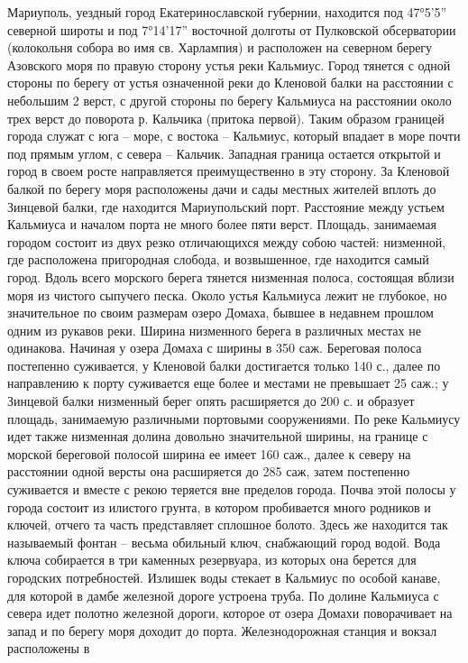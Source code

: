 Мариуполь, уездный город Екатеринославской губернии, находится под 47°5’5”
северной широты и под 7°14’17” восточной долготы от Пулковской обсерватории
(колокольня собора во имя св. Харлампия) и расположен на северном берегу
Азовского моря  по правую сторону устья реки Кальмиус. Город тянется с одной
стороны по берегу от устья означенной реки до Кленовой балки на расстоянии с
небольшим 2 верст, с другой стороны по берегу Кальмиуса на расстоянии около
трех верст до поворота р. Кальчика (притока первой). Таким образом границей
города служат с юга – море, с востока – Кальмиус, который впадает в море почти
под прямым углом, с севера – Кальчик. Западная граница остается открытой и
город в своем росте направляется преимущественно в эту сторону. За Кленовой
балкой по берегу моря расположены дачи и сады местных жителей вплоть до
Зинцевой балки, где находится Мариупольский порт. Расстояние между устьем
Кальмиуса и началом порта не много более пяти верст. Площадь, занимаемая
городом состоит из двух резко отличающихся между собою частей: низменной, где
расположена пригородная слобода, и возвышенное, где находится самый город.
Вдоль всего морского берега тянется низменная полоса, состоящая вблизи моря из
чистого сыпучего песка. Около устья Кальмиуса лежит не глубокое, но
значительное по своим размерам озеро Домаха, бывшее в недавнем прошлом одним из
рукавов реки. Ширина низменного берега в различных местах не одинакова. Начиная
у озера Домаха с ширины в 350 саж. Береговая полоса постепенно суживается, у
Кленовой балки достигается только 140 с., далее по направлению к порту
суживается еще более и местами не превышает 25 саж.; у Зинцевой балки низменный
берег опять расширяется до 200 с. и образует площадь, занимаемую различными
портовыми сооружениями. По реке Кальмиусу идет также низменная долина довольно
значительной ширины, на границе с морской береговой полосой ширина ее имеет 160
саж., далее к северу на расстоянии одной версты она расширяется до 285 саж,
затем постепенно суживается и вместе с рекою теряется вне пределов города.
Почва этой полосы у города состоит из илистого грунта, в котором пробивается
много родников и ключей, отчего та часть представляет сплошное болото. Здесь же
находится так называемый фонтан – весьма обильный ключ, снабжающий город водой.
Вода ключа собирается в три каменных резервуара, из которых она берется для
городских потребностей. Излишек воды стекает в Кальмиус по особой канаве, для
которой в дамбе железной дороге устроена труба. По долине Кальмиуса с севера
идет полотно железной дороги, которое от озера Домахи поворачивает на запад и
по берегу моря доходит до порта. Железнодорожная станция и вокзал расположены в
